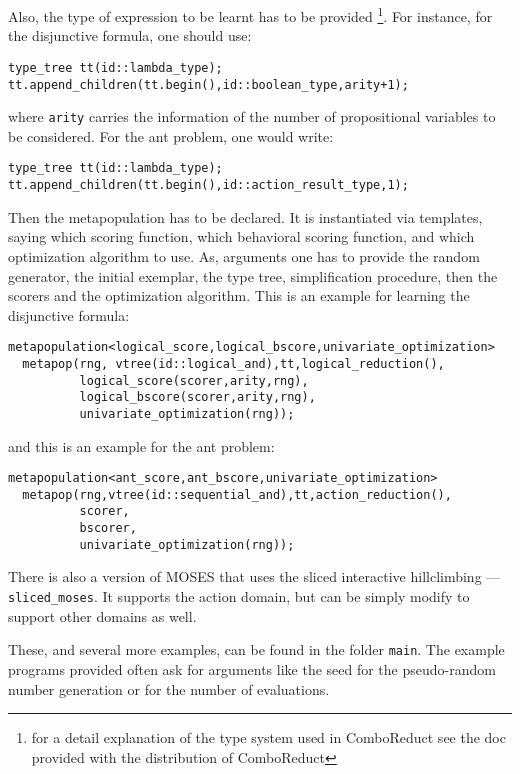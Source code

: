 \documentclass{article}
\begin{document}
Also, the type of expression to be learnt has to be provided 
\footnote{for a detail explanation of the type system used in ComboReduct
  see the doc provided with the distribution of ComboReduct}.
For instance, for the disjunctive formula, one should use:

\begin{verbatim}
type_tree tt(id::lambda_type);
tt.append_children(tt.begin(),id::boolean_type,arity+1);
\end{verbatim}

\noindent 
where \verb|arity| carries the information of the number of 
propositional variables to be considered. For the ant problem, 
one would write: 

\begin{verbatim}
type_tree tt(id::lambda_type);
tt.append_children(tt.begin(),id::action_result_type,1);
\end{verbatim}

Then the metapopulation has to be declared. It is instantiated
via templates, saying which scoring function, which behavioral scoring
function, and which optimization algorithm to use. As, arguments
one has to provide the random generator, the initial exemplar,
the type tree, simplification procedure, then the scorers and
the optimization algorithm. This is an example for learning
the disjunctive formula:

\begin{verbatim}
metapopulation<logical_score,logical_bscore,univariate_optimization> 
  metapop(rng, vtree(id::logical_and),tt,logical_reduction(),
          logical_score(scorer,arity,rng),
          logical_bscore(scorer,arity,rng),
          univariate_optimization(rng));
\end{verbatim}

\noindent 
and this is an example for the ant problem: 

\begin{verbatim}
metapopulation<ant_score,ant_bscore,univariate_optimization> 
  metapop(rng,vtree(id::sequential_and),tt,action_reduction(),
          scorer,
          bscorer,
          univariate_optimization(rng));
\end{verbatim}

There is also a version of MOSES that uses the sliced interactive
hillclimbing --- \verb|sliced_moses|. It supports the action domain,
but can be simply modify to support other domains as well.

These, and several more examples, can be found in the folder \verb|main|.
The example programs provided often ask for arguments like the seed for
the pseudo-random number generation or for the number of evaluations.
\end{document}

